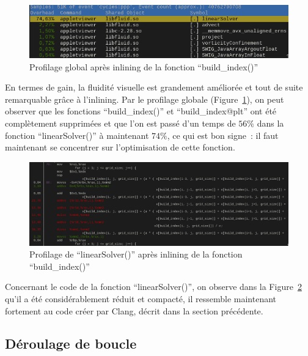 \documentclass[12pt,a4paper]{article}
\begin{document}
\begin{figure}
    \centering
    \includegraphics[scale=0.55]{figures/optims/inlining/global.png}
    \caption{Profilage global après inlining de la fonction \enquote{build\_index()}}
    \label{fig.optim.inlin.global}
\end{figure}

En termes de gain, la fluidité visuelle est grandement améliorée et tout de
suite remarquable grâce à l’inlining. Par le profilage globale
(Figure~\ref{fig.optim.inlin.global}), on peut observer que les fonctions
\enquote{build\_index()} et \enquote{build\_index@plt} ont été complètement
supprimées et que l’on est passé d’un temps de $56\%$ dans la fonction
\enquote{linearSolver()} à maintenant $74\%$, ce qui est bon signe : il faut
maintenant se concentrer sur l’optimisation de cette fonction.

\begin{figure}
    \centering
    \includegraphics[scale=0.37]{figures/optims/inlining/linearSolver.png}
    \caption{Profilage de \enquote{linearSolver()} après inlining de la fonction \enquote{build\_index()}}
    \label{fig.optim.inlin.linearSolver}
\end{figure}

Concernant le code de la fonction \enquote{linearSolver()}, on observe dans la
Figure~\ref{fig.optim.inlin.linearSolver} qu’il a été considérablement réduit et
compacté, il ressemble maintenant fortement au code créer par Clang, décrit
dans la section précédente.

\subsection{Déroulage de boucle}
\label{sub.optim.unrol}
\end{document}
